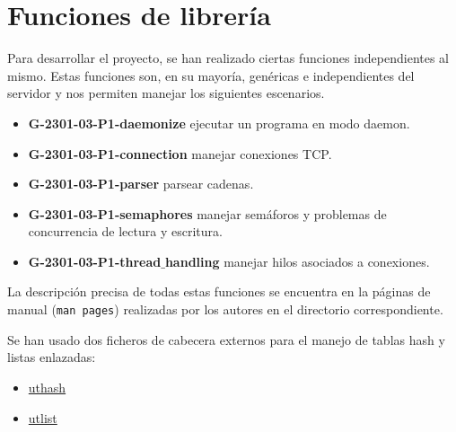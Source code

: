 \documentclass{mathnotes}
\begin{document}
\section{Funciones de librería}
Para desarrollar el proyecto, se han realizado ciertas funciones independientes al mismo. Estas funciones son, en su mayoría, genéricas e independientes del servidor y nos permiten manejar los siguientes escenarios.

\begin{itemize}
\item \textbf{G-2301-03-P1-daemonize} ejecutar un programa en modo daemon.

\item \textbf{G-2301-03-P1-connection} manejar conexiones TCP.

\item \textbf{G-2301-03-P1-parser} parsear cadenas.

\item \textbf{G-2301-03-P1-semaphores} manejar semáforos y problemas de concurrencia de lectura y escritura.

\item \textbf{G-2301-03-P1-thread$\_$handling} manejar hilos asociados a conexiones.
\end{itemize}

La descripción precisa de todas estas funciones se encuentra en la páginas de manual (\texttt{man pages}) realizadas por los autores en el directorio correspondiente.

Se han usado dos ficheros de cabecera externos para el manejo de tablas hash y listas enlazadas:
\begin{itemize}
\item \href{http://troydhanson.github.io/uthash/userguide.html}{uthash}
\item
\href{http://troydhanson.github.io/uthash/utlist.html}{utlist}
\end{itemize}
\end{document}
